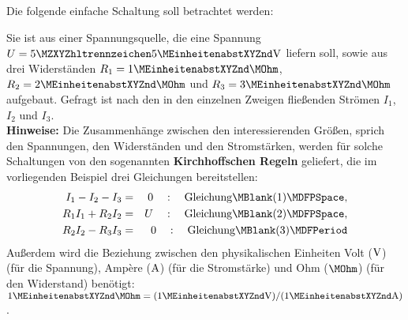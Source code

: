 \begin{MExercises}
\begin{MExercise}
Die folgende einfache Schaltung soll betrachtet werden:
\begin{center}
%
\end{center}
Sie ist aus einer Spannungsquelle, die eine Spannung $U = \MZahl{5}{5}\MEinheit{V}$ liefern soll, sowie aus drei Widerständen
$R_1 = 1\MEinheit{}\MOhm$, $R_2 = 2\MEinheit{}\MOhm$ und $R_3 = 3\MEinheit{}\MOhm$ aufgebaut. Gefragt ist nach den in den einzelnen
Zweigen fließenden Strömen $I_1$, $I_2$ und $I_3$.\\
\textbf{Hinweise:} Die Zusammenhänge zwischen den interessierenden Größen, sprich den Spannungen, den 
Widerständen und den Stromstärken, werden für solche Schaltungen von den sogenannten \textbf{Kirchhoffschen Regeln}
geliefert, die im vorliegenden Beispiel drei Gleichungen bereitstellen:
\begin{eqnarray*}
I_1 - I_2 - I_3 & = & 0\quad:\quad\mbox{Gleichung}\MBlank (1) \MDFPSpace, \\ R_1 I_1 + R_2 I_2 & = & U\quad:\quad\mbox{Gleichung}\MBlank (2)\MDFPSpace,  \\ R_2 I_2 - R_3 I_3 & = & 0\quad:\quad\mbox{Gleichung}\MBlank (3) \MDFPeriod
\end{eqnarray*}
Außerdem wird die Beziehung zwischen den physikalischen Einheiten Volt ($\MEinheit[]{V}$) (für die Spannung),
Amp\`ere ($\MEinheit[]{A}$) (für die Stromstärke) und Ohm ($\MOhm$) (für den Widerstand) benötigt: $1\MEinheit{}\MOhm = (1\MEinheit{V}) / (1\MEinheit{A})$.


\end{MExercise}
\end{MExercises}
